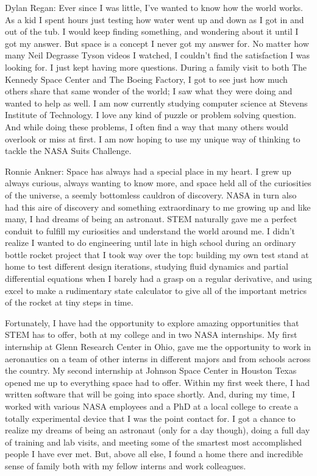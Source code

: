\documentclass{article}
\begin{document}
Dylan Regan: Ever since I was little, I've wanted to know how the world works. As a kid I spent hours just testing how water went up and down as I got in and out of the tub. I would keep finding something, and wondering about it until I got my answer. But space is a concept I never got my answer for. No matter how many Neil Degrasse Tyson videos I watched, I couldn't find the satisfaction I was looking for. I just kept having more questions. During a family visit to both The Kennedy Space Center and The Boeing Factory, I got to see just how much others share that same wonder of the world; I saw what they were doing and wanted to help as well. I am now currently studying computer science at Stevens Institute of Technology. I love any kind of puzzle or problem solving question. And while doing these problems, I often find a way that many others would overlook or miss at first. I am now hoping to use my unique way of thinking to tackle the NASA Suits Challenge.

Ronnie Ankner: Space has always had a special place in my heart. I grew up always curious, always wanting to know more, and space held all of the curiosities of the universe, a seemly bottomless cauldron of discovery. NASA in turn also had this aire of discovery and something extraordinary to me growing up and like many, I had dreams of being an astronaut. STEM naturally gave me a perfect conduit to fulfill my curiosities and understand the world around me. I didn’t realize I wanted to do engineering until late in high school during an ordinary bottle rocket project that I took way over the top: building my own test stand at home to test different design iterations, studying fluid dynamics and partial differential equations when I barely had a grasp on a regular derivative, and using excel to make a rudimentary state calculator to give all of the important metrics of the rocket at tiny steps in time.

Fortunately, I have had the opportunity to explore amazing opportunities that STEM has to offer, both at my college and in two NASA internships. My first internship at Glenn Research Center in Ohio, gave me the opportunity to work in aeronautics on a team of other interns in different majors and from schools across the country. My second internship at Johnson Space Center in Houston Texas opened me up to everything space had to offer. Within my first week there, I had written software that will be going into space shortly. And, during my time, I worked with various NASA employees and a PhD at a local college to create a totally experimental device that I was the point contact for. I got a chance to realize my dreams of being an astronaut (only for a day though), doing a full day of training and lab visits, and meeting some of the smartest most accomplished people I have ever met. But, above all else, I found a home there and incredible sense of family both with my fellow interns and work colleagues.
\end{document}
